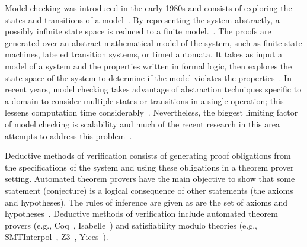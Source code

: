 Model checking was introduced in the early 1980s and consists of exploring the states and transitions of a model~\cite{clarke1981design,queille1982specification}. By representing the system abstractly, a possibly infinite state space is reduced to a finite model.~\cite{d2008survey}. The proofs are generated over an abstract mathematical model of the system, such as finite state machines, labeled transition systems, or timed automata. It takes as input a model of a system and the properties written in formal logic, then explores the state space of the system to determine if the model violates the properties~\cite{clarke2018model,fraser2009testing}. In recent years, model checking takes advantage of abstraction techniques specific to a domain to consider multiple states or transitions in a single operation; this lessens computation time considerably~\cite{d2008survey}. Nevertheless, the biggest limiting factor of model checking is scalability and much of the recent research in this area attempts to address this problem~\cite{clarke2018model}.

Deductive methods of verification consists of generating proof obligations from the specifications of the system and using these obligations in a theorem prover setting. Automated theorem provers have the main objective to show that some statement (conjecture) is a logical consequence of other statements (the axioms and hypotheses). The rules of inference are given as are the set of axioms and hypotheses~\cite{d2008survey,fitting2012first}. Deductive methods of verification include automated theorem provers (e.g., Coq~\cite{coq}, Isabelle~\cite{isabelle}) and satisfiability modulo theories (e.g., SMTInterpol~\cite{smtInterpol}, Z3~\cite{z3}, Yices~\cite{yices}). 


